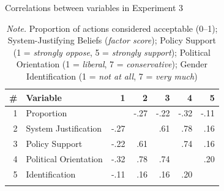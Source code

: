 \documentclass[12pt, letterpaper]{article}
\begin{document}
\begin{table}[t!]
\caption{Correlations between variables in Experiment 3}
\centering
\begin{tabular}{rlrrrrr}
\toprule
\# & Variable              &    1 &    2 &    3 &    4 &    5 \\ \midrule
 1 & Proportion            &      & -.27 & -.22 & -.32 & -.11 \\
 2 & System Justification  & -.27 &      &  .61 &  .78 &  .16 \\
 3 & Policy Support        & -.22 &  .61 &      &  .74 &  .16 \\
 4 & Political Orientation & -.32 &  .78 &  .74 &      &  .20 \\
 5 & Identification        & -.11 &  .16 &  .16 &  .20 &      \\ \bottomrule
\addlinespace
\end{tabular}
\caption*{\textit{Note.} Proportion of actions considered acceptable (0--1); System-Justifying Beliefs (\textit{factor score}); Policy Support (1 = \textit{strongly oppose}, 5 = \textit{strongly support}); Political Orientation (1 = \textit{liberal}, 7 = \textit{conservative}); Gender Identification (1 = \textit{not at all}, 7 = \textit{very much})}
\end{table}
\end{document}
